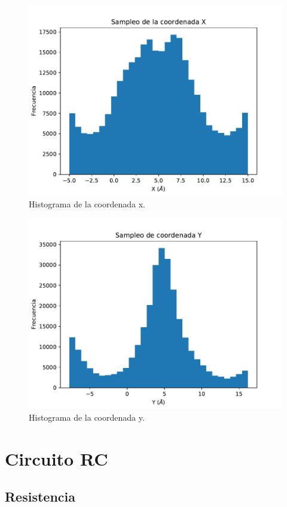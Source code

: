 \documentclass[12pt,letterpaper]{article}
\begin{document}
\begin{figure}[H]
\includegraphics{x1_hist.pdf}
\caption{Histograma de la coordenada x.}
\centering
\end{figure}

\begin{figure}[H]
\includegraphics{y1_hist.pdf}
\caption{Histograma de la coordenada y.}
\centering
\end{figure}

\section{Circuito RC}

\subsection{Resistencia}
\end{document}
